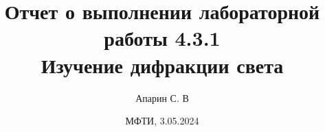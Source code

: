 \title{Отчет о выполнении лабораторной работы 4.3.1 \\ 
\textbf{Изучение дифракции света }}
\author{Апарин С. В}
\date{ МФТИ, 3.05.2024 \\}

\maketitle
\vspace {15 mm}
